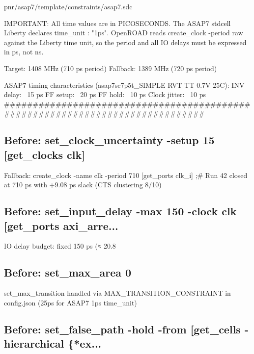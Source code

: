 \begin{relocated}{pnr/asap7/template/constraints/asap7.sdc}
\begin{textblock}
IMPORTANT: All time values are in PICOSECONDS.
The ASAP7 stdcell Liberty declares  time_unit : "1ps".
OpenROAD reads create_clock -period raw against the Liberty time unit, so
the period and all IO delays must be expressed in ps, not ns.

Target:  1408 MHz (710 ps period)
Fallback: 1389 MHz (720 ps period)

ASAP7 timing characteristics (asap7sc7p5t_SIMPLE RVT TT 0.7V 25C):
  INV delay:      ~15 ps
  FF setup:       ~20 ps
  FF hold:        ~10 ps
  Clock jitter:   ~10 ps
##############################################################################
\end{textblock}

\subsection*{Before: set\_clock\_uncertainty -setup 15 [get\_clocks clk]}

\begin{textblock}
Fallback: create_clock -name clk -period 710 [get_ports clk_i]  ;# Run 42 closed at 710 ps with +9.08 ps slack (CTS clustering 8/10)
\end{textblock}

\subsection*{Before: set\_input\_delay  -max 150 -clock clk [get\_ports axi\_arre...}

\begin{textblock}
IO delay budget: fixed 150 ps (≈ 20.8%
\end{textblock}

\subsection*{Before: set\_max\_area       0}

\begin{textblock}
set_max_transition handled via MAX_TRANSITION_CONSTRAINT in config.json (25ps for ASAP7 1ps time_unit)
\end{textblock}

\subsection*{Before: set\_false\_path -hold -from [get\_cells -hierarchical \{*ex...}


\end{relocated}
